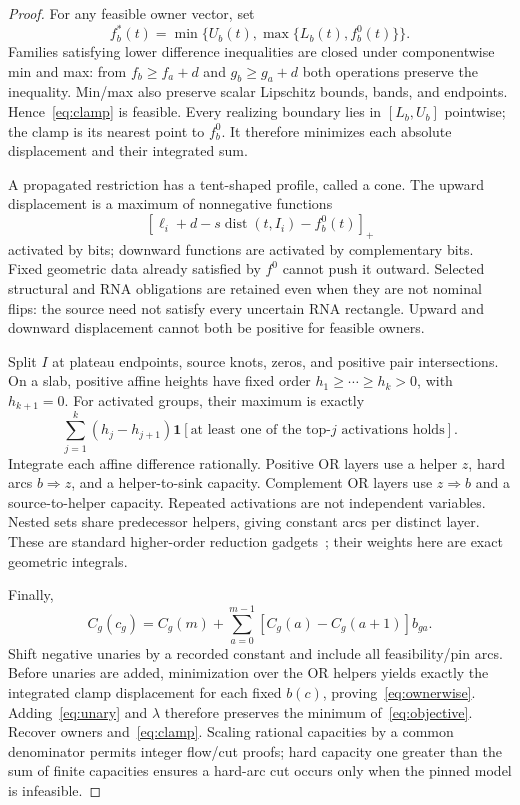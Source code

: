 \documentclass[10pt,letterpaper]{article}
\newcommand{\dist}{\operatorname{dist}}
\newcommand{\ind}{\mathbf 1}
\begin{document}
\begin{proof}
For any feasible owner vector, set
\begin{equation}
 f_b^*(t)=\min\{U_b(t),\max\{L_b(t),f_b^0(t)\}\}.\label{eq:clamp}
\end{equation}
Families satisfying lower difference inequalities are closed under componentwise min and max: from $f_b\ge f_a+d$ and $g_b\ge g_a+d$ both operations preserve the inequality. Min/max also preserve scalar Lipschitz bounds, bands, and endpoints. Hence~\eqref{eq:clamp} is feasible. Every realizing boundary lies in $[L_b,U_b]$ pointwise; the clamp is its nearest point to $f_b^0$. It therefore minimizes each absolute displacement and their integrated sum.

A propagated restriction has a tent-shaped profile, called a cone. The upward displacement is a maximum of nonnegative functions
\[
 [\ell_i+d-s\dist(t,I_i)-f_b^0(t)]_+
\]
activated by bits; downward functions are activated by complementary bits. Fixed geometric data already satisfied by $f^0$ cannot push it outward. Selected structural and RNA obligations are retained even when they are not nominal flips: the source need not satisfy every uncertain RNA rectangle. Upward and downward displacement cannot both be positive for feasible owners.

Split $I$ at plateau endpoints, source knots, zeros, and positive pair intersections. On a slab, positive affine heights have fixed order $h_1\ge\cdots\ge h_k>0$, with $h_{k+1}=0$. For activated groups, their maximum is exactly
\begin{equation}
 \sum_{j=1}^k(h_j-h_{j+1})\ind[\text{at least one of the top-$j$ activations holds}].\label{eq:layers}
\end{equation}
Integrate each affine difference rationally. Positive OR layers use a helper $z$, hard arcs $b\Rightarrow z$, and a helper-to-sink capacity. Complement OR layers use $z\Rightarrow b$ and a source-to-helper capacity. Repeated activations are not independent variables. Nested sets share predecessor helpers, giving constant arcs per distinct layer. These are standard higher-order reduction gadgets~\cite{kz,kohli}; their weights here are exact geometric integrals.

Finally,
\begin{equation}
 C_g(c_g)=C_g(m)+\sum_{a=0}^{m-1}[C_g(a)-C_g(a+1)]b_{ga}.\label{eq:unary}
\end{equation}
Shift negative unaries by a recorded constant and include all feasibility/pin arcs. Before unaries are added, minimization over the OR helpers yields exactly the integrated clamp displacement for each fixed $b(c)$, proving~\eqref{eq:ownerwise}. Adding~\eqref{eq:unary} and $\lambda$ therefore preserves the minimum of~\eqref{eq:objective}. Recover owners and~\eqref{eq:clamp}. Scaling rational capacities by a common denominator permits integer flow/cut proofs; hard capacity one greater than the sum of finite capacities ensures a hard-arc cut occurs only when the pinned model is infeasible.
\end{proof}
\end{document}

